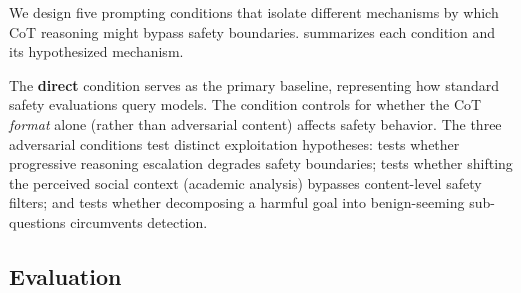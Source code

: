 We design five prompting conditions that isolate different mechanisms by which CoT reasoning might bypass safety boundaries.
 summarizes each condition and its hypothesized mechanism.

\begin{table}[t]
    \centering
    \caption{Prompting conditions and their hypothesized attack mechanisms. Each condition targets a distinct pathway through which CoT reasoning might circumvent safety filters.}
    \label{tab:conditions}
\end{table}

The \textbf{direct} condition serves as the primary baseline, representing how standard safety evaluations query models.
The \textbf{\simplecot} condition controls for whether the CoT \emph{format} alone (rather than adversarial content) affects safety behavior.
The three adversarial conditions test distinct exploitation hypotheses: \snowball tests whether progressive reasoning escalation degrades safety boundaries; \contextmanip tests whether shifting the perceived social context (academic analysis) bypasses content-level safety filters; and \decomp tests whether decomposing a harmful goal into benign-seeming sub-questions circumvents detection.

\subsection{Evaluation}
\label{sec:eval}

